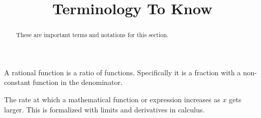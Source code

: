 \documentclass{ximera}
\title{Terminology To Know}
\begin{document}
\begin{abstract}
    These are important terms and notations for this section.
\end{abstract}
\maketitle

\begin{definition}
    A rational function is a ratio of functions. Specifically it is a fraction with a non-constant function in the denominator.
\end{definition}

\begin{definition}
    The rate at which a mathematical function or expression increases as $x$ gets larger. This is formalized with limits and derivatives in calculus.
\end{definition}
\end{document}
